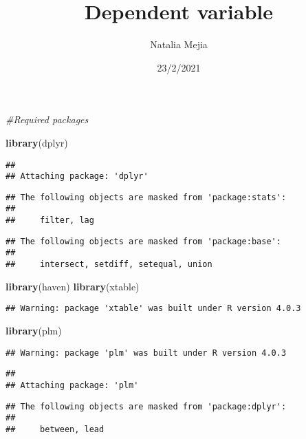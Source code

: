 \documentclass[
]{article}
\title{Dependent variable}
\author{Natalia Mejia}
\date{23/2/2021}
\newenvironment{Shaded}{\begin{snugshade}}{\end{snugshade}}
\newcommand{\CommentTok}[1]{\textcolor[rgb]{0.56,0.35,0.01}{\textit{#1}}}
\newcommand{\KeywordTok}[1]{\textcolor[rgb]{0.13,0.29,0.53}{\textbf{#1}}}
\newcommand{\NormalTok}[1]{#1}
\begin{document}
\maketitle

\begin{Shaded}
\begin{Highlighting}[]
\CommentTok{#Required packages}

\KeywordTok{library}\NormalTok{(dplyr)}
\end{Highlighting}
\end{Shaded}

\begin{verbatim}
## 
## Attaching package: 'dplyr'
\end{verbatim}

\begin{verbatim}
## The following objects are masked from 'package:stats':
## 
##     filter, lag
\end{verbatim}

\begin{verbatim}
## The following objects are masked from 'package:base':
## 
##     intersect, setdiff, setequal, union
\end{verbatim}

\begin{Shaded}
\begin{Highlighting}[]
\KeywordTok{library}\NormalTok{(haven)}
\KeywordTok{library}\NormalTok{(xtable)}
\end{Highlighting}
\end{Shaded}

\begin{verbatim}
## Warning: package 'xtable' was built under R version 4.0.3
\end{verbatim}

\begin{Shaded}
\begin{Highlighting}[]
\KeywordTok{library}\NormalTok{(plm)}
\end{Highlighting}
\end{Shaded}

\begin{verbatim}
## Warning: package 'plm' was built under R version 4.0.3
\end{verbatim}

\begin{verbatim}
## 
## Attaching package: 'plm'
\end{verbatim}

\begin{verbatim}
## The following objects are masked from 'package:dplyr':
## 
##     between, lead
\end{verbatim}
\end{document}
